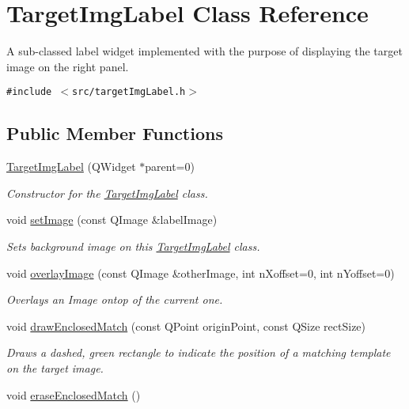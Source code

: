 \hypertarget{classTargetImgLabel}{
\section{TargetImgLabel Class Reference}
\label{classTargetImgLabel}
}
A sub-classed label widget implemented with the purpose of displaying the target image on the right panel.  


{\tt \#include $<$src/targetImgLabel.h$>$}

\subsection*{Public Member Functions}
\begin{CompactItemize}
\item 
\hypertarget{classTargetImgLabel_cb3dcfa8b9616be0a355c90db81aaba2}{
\hyperlink{classTargetImgLabel_cb3dcfa8b9616be0a355c90db81aaba2}{TargetImgLabel} (QWidget $\ast$parent=0)}
\label{classTargetImgLabel_cb3dcfa8b9616be0a355c90db81aaba2}

\begin{CompactList}\small\item\em Constructor for the \hyperlink{classTargetImgLabel}{TargetImgLabel} class. \item\end{CompactList}\item 
void \hyperlink{classTargetImgLabel_2ec40d8850e3d9cc4d5c9984412c0cfb}{setImage} (const QImage \&labelImage)
\begin{CompactList}\small\item\em Sets background image on this \hyperlink{classTargetImgLabel}{TargetImgLabel} class. \item\end{CompactList}\item 
void \hyperlink{classTargetImgLabel_09dbad77c225942d7a604e06a119f60d}{overlayImage} (const QImage \&otherImage, int nXoffset=0, int nYoffset=0)
\begin{CompactList}\small\item\em Overlays an Image ontop of the current one. \item\end{CompactList}\item 
void \hyperlink{classTargetImgLabel_b835774d14df1e93cb0fd010d1a2e699}{drawEnclosedMatch} (const QPoint originPoint, const QSize rectSize)
\begin{CompactList}\small\item\em Draws a dashed, green rectangle to indicate the position of a matching template on the target image. \item\end{CompactList}\item 
\hypertarget{classTargetImgLabel_d060485d97c7797339243b23f3ea05ef}{
void \hyperlink{classTargetImgLabel_d060485d97c7797339243b23f3ea05ef}{eraseEnclosedMatch} ()}
\label{classTargetImgLabel_d060485d97c7797339243b23f3ea05ef}


\end{CompactItemize}
